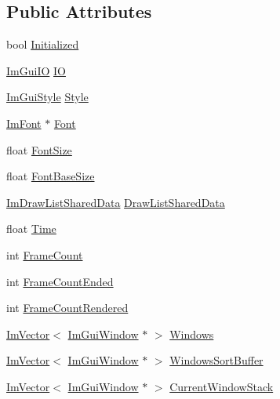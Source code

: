 \subsection*{Public Attributes}
\begin{DoxyCompactItemize}
\item 
bool \hyperlink{struct_im_gui_context_a71b32432f5c4658b4772b293640a66c0}{Initialized}
\item 
\hyperlink{struct_im_gui_i_o}{Im\+Gui\+IO} \hyperlink{struct_im_gui_context_add4fdcc8c6a437d8f8e7c837418be83c}{IO}
\item 
\hyperlink{struct_im_gui_style}{Im\+Gui\+Style} \hyperlink{struct_im_gui_context_a2e682502e1a3d2c399171dd3c4fc969d}{Style}
\item 
\hyperlink{struct_im_font}{Im\+Font} $\ast$ \hyperlink{struct_im_gui_context_aec64e774018a7d74515baeb9e06fb4e3}{Font}
\item 
float \hyperlink{struct_im_gui_context_af4022d1866887cdc400131fc6a65b200}{Font\+Size}
\item 
float \hyperlink{struct_im_gui_context_a0fcbda57d25b80111283ed7305ee3ee8}{Font\+Base\+Size}
\item 
\hyperlink{struct_im_draw_list_shared_data}{Im\+Draw\+List\+Shared\+Data} \hyperlink{struct_im_gui_context_a71045e6879ff2d074836273ba00674e6}{Draw\+List\+Shared\+Data}
\item 
float \hyperlink{struct_im_gui_context_a88ebae89e11da57e4567767694f7576f}{Time}
\item 
int \hyperlink{struct_im_gui_context_ab9a1f3b3f15f0a6c5f29aef85f1a8ea2}{Frame\+Count}
\item 
int \hyperlink{struct_im_gui_context_aa4cc3099c789be981d665c617b6d78a9}{Frame\+Count\+Ended}
\item 
int \hyperlink{struct_im_gui_context_a64a96ecd43f4b10c1fec8eb3fc9bff89}{Frame\+Count\+Rendered}
\item 
\hyperlink{class_im_vector}{Im\+Vector}$<$ \hyperlink{struct_im_gui_window}{Im\+Gui\+Window} $\ast$ $>$ \hyperlink{struct_im_gui_context_a0f59a9a861d097be066c6cc106e40f3e}{Windows}
\item 
\hyperlink{class_im_vector}{Im\+Vector}$<$ \hyperlink{struct_im_gui_window}{Im\+Gui\+Window} $\ast$ $>$ \hyperlink{struct_im_gui_context_af33de778de28b057fa7a42e4cbe0017a}{Windows\+Sort\+Buffer}
\item 
\hyperlink{class_im_vector}{Im\+Vector}$<$ \hyperlink{struct_im_gui_window}{Im\+Gui\+Window} $\ast$ $>$ \hyperlink{struct_im_gui_context_a19020a20e7bca2fadbb287106b92891b}{Current\+Window\+Stack}

\end{DoxyCompactItemize}
